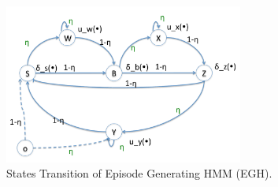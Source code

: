 \begin{figure}[!hbtp]
\centering
\includegraphics[width=0.7\textwidth]{adlfigs/egh.pdf}
\caption{States Transition of Episode Generating HMM (EGH).\label{fig_egh}}
\end{figure}

